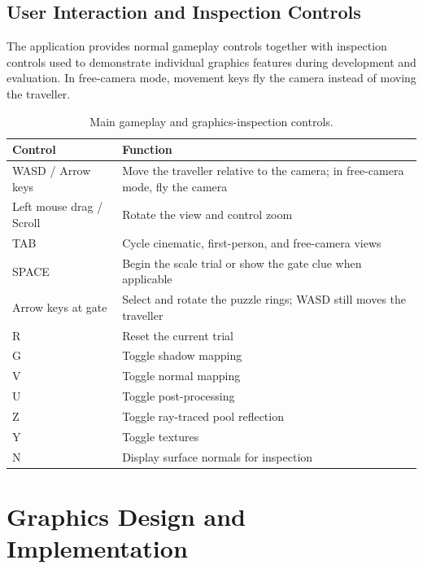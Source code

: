 \documentclass[11pt,a4paper]{article}
\begin{document}
\subsection{User Interaction and Inspection Controls}

The application provides normal gameplay controls together with inspection
controls used to demonstrate individual graphics features during development
and evaluation. In free-camera mode, movement keys fly the camera instead of
moving the traveller.

\begin{table}[H]
    \centering
    \small
    \begin{tabular}{p{} p{}}
        \toprule
        \textbf{Control} & \textbf{Function} \\
        \midrule
        WASD / Arrow keys & Move the traveller relative to the camera; in free-camera mode, fly the camera \\
        Left mouse drag / Scroll & Rotate the view and control zoom \\
        TAB & Cycle cinematic, first-person, and free-camera views \\
        SPACE & Begin the scale trial or show the gate clue when applicable \\
        Arrow keys at gate & Select and rotate the puzzle rings; WASD still moves the traveller \\
        R & Reset the current trial \\
        G & Toggle shadow mapping \\
        V & Toggle normal mapping \\
        U & Toggle post-processing \\
        Z & Toggle ray-traced pool reflection \\
        Y & Toggle textures \\
        N & Display surface normals for inspection \\
        \bottomrule
    \end{tabular}
    \caption{Main gameplay and graphics-inspection controls.}
    \label{tab:controls}
\end{table}



\section{Graphics Design and Implementation}
\end{document}
